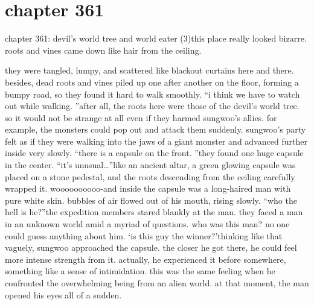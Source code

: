 \section{chapter 361}

chapter 361: devil’s world tree and world eater (3)this place really looked bizarre.
 roots and vines came down like hair from the ceiling.





they were tangled, lumpy, and scattered like blackout curtains here and there.
besides, dead roots and vines piled up one after another on the floor, forming a bumpy road, so they found it hard to walk smoothly.
“i think we have to watch out while walking.
”after all, the roots here were those of the devil’s world tree.
 so it would not be strange at all even if they harmed sungwoo’s allies.
 for example, the monsters could pop out and attack them suddenly.
sungwoo’s party felt as if they were walking into the jaws of a giant monster and advanced further inside very slowly.
“there is a capsule on the front.
”they found one huge capsule in the center.
“it’s unusual…”like an ancient altar, a green glowing capsule was placed on a stone pedestal, and the roots descending from the ceiling carefully wrapped it.
woooooooooo-and inside the capsule was a long-haired man with pure white skin.
 bubbles of air flowed out of his mouth, rising slowly.
“who the hell is he?”the expedition members stared blankly at the man.
 they faced a man in an unknown world amid a myriad of questions.
 who was this man? no one could guess anything about him.
‘is this guy the winner?’thinking like that vaguely, sungwoo approached the capsule.
 the closer he got there, he could feel more intense strength from it.
 actually, he experienced it before somewhere, something like a sense of intimidation.
 this was the same feeling when he confronted the overwhelming being from an alien world.
at that moment, the man opened his eyes all of a sudden.

